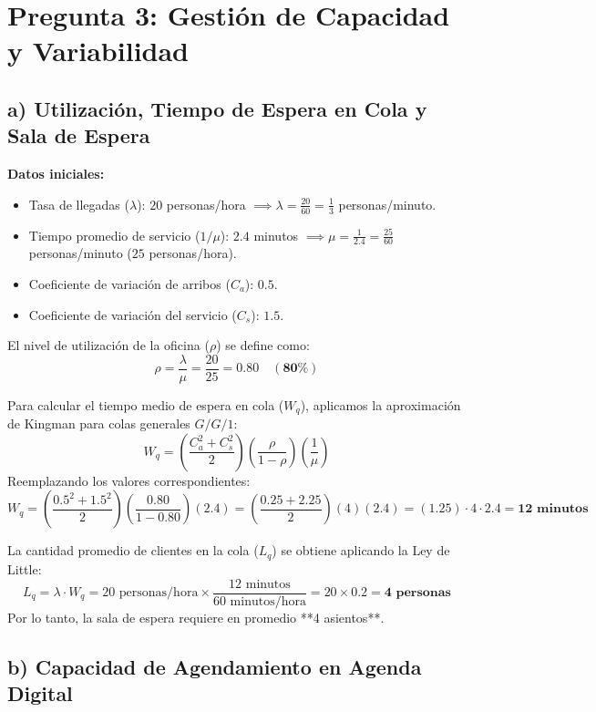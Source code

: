 \documentclass[11pt, a4paper]{article}
\begin{document}
\newpage

\section*{Pregunta 3: Gestión de Capacidad y Variabilidad}

\subsection*{a) Utilización, Tiempo de Espera en Cola y Sala de Espera}

\textbf{Datos iniciales:}
\begin{itemize}
  \item Tasa de llegadas ($\lambda$): $20$ personas/hora $\implies \lambda = \frac{20}{60} = \frac{1}{3}$ personas/minuto.
  \item Tiempo promedio de servicio ($1/\mu$): $2.4$ minutos $\implies \mu = \frac{1}{2.4} = \frac{25}{60}$ personas/minuto ($25$ personas/hora).
  \item Coeficiente de variación de arribos ($C_a$): $0.5$.
  \item Coeficiente de variación del servicio ($C_s$): $1.5$.
\end{itemize}

El nivel de utilización de la oficina ($\rho$) se define como:
\[
  \rho = \frac{\lambda}{\mu} = \frac{20}{25} = \mathbf{0.80 \quad (80\%)}
\]

Para calcular el tiempo medio de espera en cola ($W_q$), aplicamos la aproximación de Kingman para colas generales $G/G/1$:
\[
  W_q = \left( \frac{C_a^2 + C_s^2}{2} \right) \left( \frac{\rho}{1 - \rho} \right) \left( \frac{1}{\mu} \right)
\]
Reemplazando los valores correspondientes:
\[
  W_q = \left( \frac{0.5^2 + 1.5^2}{2} \right) \left( \frac{0.80}{1 - 0.80} \right) (2.4) = \left( \frac{0.25 + 2.25}{2} \right) (4) (2.4) = (1.25) \cdot 4 \cdot 2.4 = \mathbf{12 \text{ minutos}}
\]

La cantidad promedio de clientes en la cola ($L_q$) se obtiene aplicando la Ley de Little:
\[
  L_q = \lambda \cdot W_q = 20 \text{ personas/hora} \times \frac{12 \text{ minutos}}{60 \text{ minutos/hora}} = 20 \times 0.2 = \mathbf{4 \text{ personas}}
\]
Por lo tanto, la sala de espera requiere en promedio **4 asientos**.

\subsection*{b) Capacidad de Agendamiento en Agenda Digital}
\end{document}

